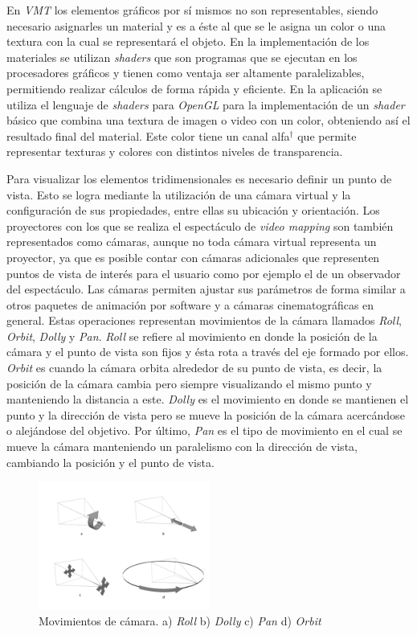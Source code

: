 En \emph{VMT} los elementos gráficos por sí mismos no son representables, siendo necesario asignarles un material y es a éste al que se le asigna un color o una textura con la cual se representará el objeto.
En la implementación de los materiales se utilizan \emph{shaders} que son programas que se ejecutan en los procesadores gráficos y tienen como ventaja ser altamente paralelizables, permitiendo realizar cálculos de forma rápida y eficiente. En la aplicación se utiliza el lenguaje de \emph{shaders} \cite{GLSL} para \emph{OpenGL} para la implementación de un \emph{shader} básico que combina una textura de imagen o video con un color, obteniendo así el resultado final del material. Este color tiene un canal alfa$^\dagger$ que permite representar texturas y colores con distintos niveles de transparencia.

Para visualizar los elementos tridimensionales es necesario definir un punto de vista. Esto se logra mediante la utilización de una cámara virtual y la configuración de sus propiedades, entre ellas su ubicación y orientación. Los proyectores con los que se realiza el espectáculo de \emph{video mapping} son también representados como cámaras, aunque no toda cámara virtual representa un proyector, ya que es posible contar con cámaras adicionales que representen puntos de vista de interés para el usuario como por ejemplo el de un observador del espectáculo.
Las cámaras permiten ajustar sus parámetros de forma similar a otros paquetes de animación por software y a cámaras cinematográficas en general. Estas operaciones representan movimientos de la cámara llamados \emph{Roll}, \emph{Orbit}, \emph{Dolly} y \emph{Pan}.
\emph{Roll} se refiere al movimiento en donde la posición de la cámara y el punto de vista son fijos y ésta rota a través del eje formado por ellos.
\emph{Orbit} es cuando la cámara orbita alrededor de su punto de vista, es decir, la posición de la cámara cambia pero siempre visualizando el mismo punto y manteniendo la distancia a este.
\emph{Dolly} es el movimiento en donde se mantienen el punto y la dirección de vista pero se mueve la posición de la cámara acercándose o alejándose del objetivo.
Por último, \emph{Pan} es el tipo de movimiento en el cual se mueve la cámara manteniendo un paralelismo con la dirección de vista, cambiando la posición y el punto de vista.

\begin{figure}[H]
  \centering
    \includegraphics[width=0.5\textwidth]{./Cap5_vmt/vmtengine-cameramove.png}
  \caption[Imagen propia.]{Movimientos de cámara. a) \emph{Roll} b) \emph{Dolly} c) \emph{Pan} d) \emph{Orbit}}
  \label{fig:VMT-CameraMove}
\end{figure}

